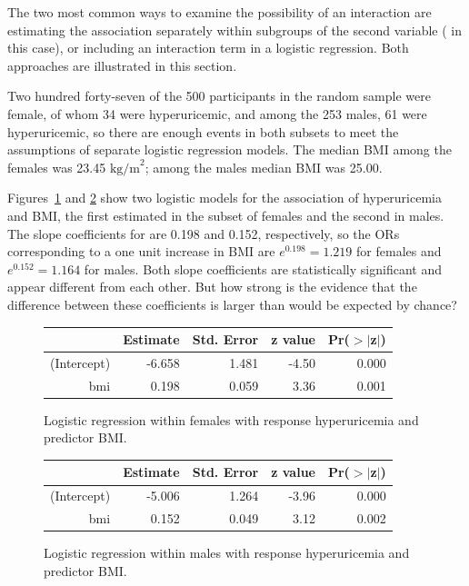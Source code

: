 The two most common ways to examine the possibility of an interaction are estimating the association separately within subgroups of the second variable ( in this case), or including an interaction term in a logistic regression.  Both approaches are illustrated in this section.

Two hundred forty-seven of the 500 participants in the random sample were female, of whom 34 were hyperuricemic, and among the 253 males, 61 were hyperuricemic, so there are enough events in both subsets to meet the assumptions of separate logistic regression models.  The median BMI among the females was 23.45 $\text{kg/m}^2$; among the males median BMI was 25.00.

Figures~\ref{figure:bmiHyperuricemiaFemalesLogReg} and \ref{figure:bmiHyperuricemiaMalesLogReg} show two logistic models for the association of hyperuricemia and BMI, the first estimated in the subset of females and the second in males. The slope coefficients for  are 0.198 and 0.152, respectively, so the ORs corresponding to a one unit increase in BMI are $e^{0.198} = 1.219$ for females and $e^{0.152} = 1.164$ for males. Both slope coefficients are statistically significant and appear different from each other.  But how strong is the evidence that the difference between these coefficients is larger than would be expected by chance?


\begin{figure}[ht]
\centering
\begin{tabular}{rrrrr}
  \hline
 & Estimate & Std. Error & z value & Pr($>$$|$z$|$) \\
  \hline
(Intercept) & -6.658 & 1.481 & -4.50 & 0.000 \\
  bmi & 0.198 & 0.059 & 3.36 & 0.001 \\
   \hline
\end{tabular}
\caption{Logistic regression within females with response hyperuricemia
        and predictor BMI.}
\label{figure:bmiHyperuricemiaFemalesLogReg}
\end{figure}


\begin{figure}[ht]
\centering
\begin{tabular}{rrrrr}
  \hline
 & Estimate & Std. Error & z value & Pr($>$$|$z$|$) \\
  \hline
(Intercept) & -5.006 & 1.264 & -3.96 & 0.000 \\
  bmi & 0.152 & 0.049 & 3.12 & 0.002 \\
   \hline
\end{tabular}
\caption{Logistic regression within males with response hyperuricemia
        and predictor BMI.}
\label{figure:bmiHyperuricemiaMalesLogReg}
\end{figure}


